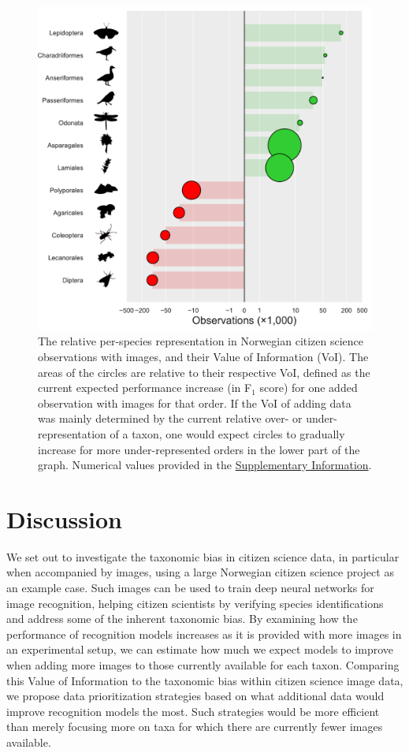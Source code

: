 \documentclass{article}
\begin{document}
\begin{figure}[!ht]
  \includegraphics[width=\textwidth]{4}
  \caption{\footnotesize The relative per-species representation in Norwegian citizen science observations with images, and their Value of Information (VoI). The areas of the circles are relative to their respective VoI, defined as the current expected performance increase (in F\(_1\) score) for one added observation with images for that order. If the VoI of adding data was mainly determined by the current relative over- or under-representation of a taxon, one would expect circles to gradually increase for more under-represented orders in the lower part of the graph. Numerical values provided in the \hyperref[tab:biases]{Supplementary Information}.}
  \label{fig:VoI_vs_bias}
\end{figure}


\section*{Discussion}
We set out to investigate the taxonomic bias in citizen science data, in particular when accompanied by images, using a large Norwegian citizen science project as an example case. Such images can be used to train deep neural networks for image recognition, helping citizen scientists by verifying species identifications and address some of the inherent taxonomic bias. By examining how the performance of recognition models increases as it is provided with more images in an experimental setup, we can estimate how much we expect models to improve when adding more images to those currently available for each taxon. Comparing this Value of Information to the taxonomic bias within citizen science image data, we propose data prioritization strategies based on what additional data would improve recognition models the most. Such strategies would be more efficient than merely focusing more on taxa for which there are currently fewer images available.
\end{document}
